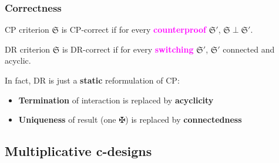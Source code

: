 \documentclass[usenames,dvipsnames]{beamer}
\newcommand{\dai}{✠}
\newcommand{\seq}{\vdash}
\newcommand{\irule}[1]{\footnotesize$#1$}
\begin{document}
\begin{frame}
    \frametitle{Correctness}
    \begin{block}{\textrm{CP} criterion}
        $\mathfrak{S}$ is \textrm{CP}-correct if for every
        \textbf{\textcolor{magenta}{counterproof}} $\mathfrak{S'}$, $\mathfrak{S} \perp
        \mathfrak{S}'$.
    \end{block}
    \begin{block}{\textrm{DR} criterion}
        $\mathfrak{S}$ is \textrm{DR}-correct if for every \textbf{\textcolor{magenta}{switching}}
        $\mathfrak{S'}$, $\mathfrak{S}'$ connected and acyclic.
    \end{block}
    \vspace{1em}
    In fact, \textrm{DR} is just a \textbf{static} reformulation of \textrm{CP}:
    \vspace{1em}
    \begin{itemize}
        \setlength\itemsep{1em}
        \item \textbf{Termination} of interaction is replaced by \textbf{acyclicity}
        \item \textbf{Uniqueness} of result (one $\dai$) is replaced by \textbf{connectedness}
    \end{itemize}

\end{frame}

\subsection{Multiplicative c-designs}
\end{document}
